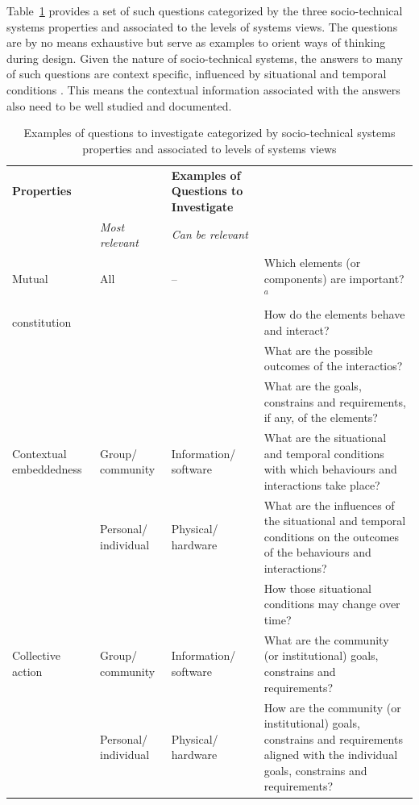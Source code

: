 Table~\ref{tab:questions} provides a set of such questions categorized by the three socio-technical systems properties and associated to the levels of systems views. The questions are by no means exhaustive but serve as examples to orient ways of thinking during design. 
Given the nature of socio-technical systems, the answers to many of such questions are context specific, influenced by situational and temporal conditions \cite{Baxter2011,Norman2015}. This means the contextual information associated with the answers also need to be well studied and documented. 
% 
\begin{table}
\caption{Examples of questions to investigate categorized by socio-technical systems properties and associated to levels of systems views }
\label{tab:questions}       %
%
%
\begin{tabular}{>{\raggedright}p{2cm}>{\raggedright}p{1.6cm}>{\raggedright}p{1.7cm}p{6.2cm}}
\hline\noalign{\smallskip}
\textbf{Properties}  & \multicolumn{2}{l}{\textbf{Relevant Levels of Views}} &   \textbf{Examples of Questions to Investigate} \\
  &   \textit{Most relevant} & \textit{Can be relevant} &  \\
\noalign{\smallskip}\svhline\noalign{\smallskip}
Mutual & All & -- & Which elements (or components) are important? $^a$  \\
constitution &   &  & How do the elements behave and interact?\\
  &   &  & What are the possible outcomes of the interactios?\\
  &   &  & What are the goals, constrains and requirements, if any, of the elements?\\ \hline\noalign{\smallskip}
Contextual embeddedness &   Group/ community &  Information/ software & What are the situational and temporal conditions with which behaviours and interactions take place? \\
 &   Personal/ individual &  Physical/ hardware & What are the influences of  the situational and temporal conditions on the outcomes of the behaviours and interactions?\\
 &     &    & How those situational conditions may change over time?\\ \hline\noalign{\smallskip}
Collective action   & Group/ community  &  Information/ software & What are the community (or institutional) goals, constrains and requirements?\\
   &  Personal/ individual  & Physical/ hardware & How are the community (or institutional) goals, constrains and requirements aligned with the individual goals, constrains and requirements? \\

\end{tabular}
\end{table}
